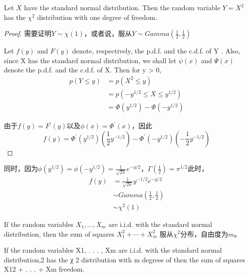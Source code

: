 \documentclass[../main.tex]{subfiles}
\begin{document}
\begin{theorem}{}{}
Let $X$ have the standard normal distribution. Then the random variable $Y=X^2$ has the $\chi^2$ distribution with one degree of freedom.
\end{theorem}
\begin{proof}
需要证明$Y\sim \chi(1)$，或者说，服从$Y\sim Gamma(\frac{1}{2}, \frac{1}{2})$

Let $f(y)$ and $F(y)$ denote, respectively, the p.d.f. and the c.d.f. of Y . Also, since X has the standard normal distribution, we shall let $\psi(x)$ and $\Psi(x)$ denote the p.d.f. and the c.d.f. of X. Then for y > 0,
\begin{equation}\label{}
\begin{split}
p(Y\leqslant y)&=p(X^2\leqslant y)\\
&=p(-y^{1/2} \leqslant X \leqslant y^{1/2})\\
&=\Phi(y^{1/2}) - \Phi(-y^{1/2})
\end{split}
\end{equation}

由于$f(y)=F^{'}(y)$以及$\phi(x)=\Phi^{'}(x)$，因此
\begin{equation}\label{}
f(y)=\Phi^{'}(y^{1/2})(\frac{1}{2}y^{-1/2}) - \Phi^{'}(-y^{1/2})(-\frac{1}{2}y^{-1/2})
\end{equation}
\end{proof}
同时，因为$\phi(y^{1/2})=\phi(-y^{1/2})=\frac{1}{\sqrt{2\pi}}e^{-y/2}$，$\Gamma(\frac{1}{2})=\pi^{1/2}$此时，
\begin{equation}\label{}
\begin{split}
f(y)&=\frac{1}{\sqrt{2\pi}}y^{-1/2}e^{-y/2}\\
&\sim Gamma(\frac{1}{2}, \frac{1}{2})\\
&\sim \chi^2(1)
\end{split}
\end{equation}

\begin{corollary}
If the random variables $X_1, \dots, X_m$ are i.i.d. with the standard normal distribution, then the sum of squares $X_1^2+\cdots+X_m^2$ 服从$\chi^2$分布，自由度为$m$。
\end{corollary}
If the random variables X1, . . . , Xm are i.i.d. with the standard normal distribution,2 has the χ 2 distribution with m degrees of
then the sum of squares X12 + . . . + Xm
freedom.
\end{document}
